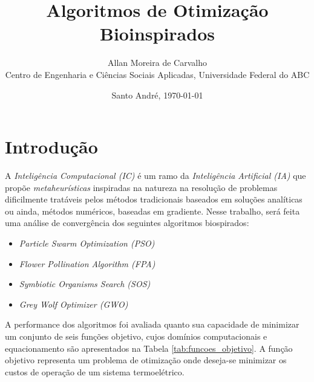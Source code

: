 \documentclass[a4paper, 11pt]{article}
\title{Algoritmos de Otimização Bioinspirados}
\author{Allan Moreira de Carvalho \\
Centro de Engenharia e Ciências Sociais Aplicadas, Universidade Federal do ABC}
\date{Santo André, \today}
\begin{document}
\maketitle


\begin{abstract}
\end{abstract}

\tableofcontents



\section{Introdução}

A \textit{Inteligência Computacional (IC)} é um ramo da \textit{Inteligência Artificial (IA)} 
que propõe \textit{metaheurísticas} inspiradas na natureza na resolução de problemas dificilmente 
tratáveis pelos métodos tradicionais baseados em soluções analíticas ou ainda, métodos numéricos, 
baseadas em gradiente. Nesse trabalho, será feita uma análise de convergência dos seguintes algoritmos 
biospirados:

\begin{itemize}
    \item \textit{Particle Swarm Optimization (PSO)}
    \item \textit{Flower Pollination Algorithm (FPA)}
    \item \textit{Symbiotic Organisms Search (SOS)}
    \item \textit{Grey Wolf Optimizer (GWO)}
\end{itemize}

A performance dos algoritmos foi avaliada quanto sua capacidade de minimizar um conjunto de seis funções
 objetivo, cujos domínios computacionais e equacionamento são apresentados na Tabela \ref{tab:funcoes_objetivo}.
 A função objetivo  representa um problema de otimização onde deseja-se minimizar os custos
 de operação de um sistema termoelétrico. 
\end{document}
